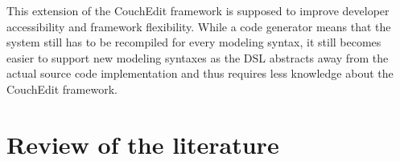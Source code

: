 \documentclass[10pt,a4paper,oneside]{scrartcl}
\newcommand\hint[2]{
\ifthenelse{\boolean{showhints}}{
\begin{center}
\colorbox{black!10}{
\begin{minipage}{.963\textwidth}
#2\hfill\textbf{#1}
\end{minipage}
}\end{center}}{}
}
\begin{document}
This extension of the CouchEdit framework is supposed to improve developer accessibility and framework flexibility. While a code generator means that the system still has to be recompiled for every modeling syntax, it still becomes easier to support new modeling syntaxes as the DSL abstracts away from the actual source code implementation and thus requires less knowledge about the CouchEdit framework.


\section{Review of the literature}






\end{document}
